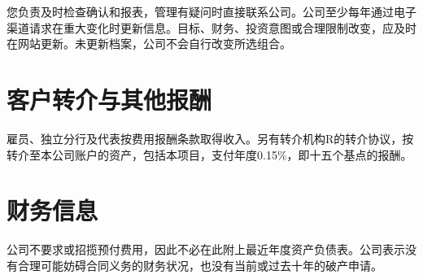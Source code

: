 \documentclass[UTF8,fontset=none,11pt,a4paper]{ctexart}
\begin{document}
您负责及时检查确认和报表，管理有疑问时直接联系公司。公司至少每年通过电子渠道请求在重大变化时更新信息。目标、财务、投资意图或合理限制改变，应及时在网站更新。未更新档案，公司不会自行改变\allowbreak\mbox{所选组合。}


\section*{客户转介与其他报酬}
雇员、独立分行及代表按费用报酬条款取得收入。另有转介机构R的转介协议，按转介至本公司账户的资产，包括本项目，支付年度0.15\%，即十五个基点\allowbreak\mbox{的报酬。}


\section*{财务信息}
公司不要求或招揽预付费用，因此不必在此附上最近年度资产负债表。公司表示没有合理可能妨碍合同义务的财务状况，也没有当前或过去十年的\allowbreak\mbox{破产申请。}
\end{document}
